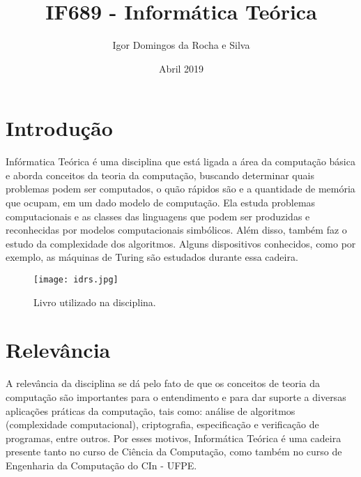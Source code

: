 \documentclass[10pt]{article}
\title{IF689 - Informática Teórica}
\author{Igor Domingos da Rocha e Silva }
\date{Abril 2019}
\begin{document}
\maketitle

\section{Introdução}
Infórmatica Teórica é uma disciplina que está ligada a área da computação básica e aborda conceitos da teoria da computação, buscando determinar quais problemas podem ser computados, o quão rápidos são e a quantidade de memória que ocupam,  em um dado modelo de computação. Ela estuda problemas computacionais e as classes das linguagens que podem ser produzidas e reconhecidas por modelos computacionais simbólicos. Além disso, também faz o estudo da complexidade dos algoritmos. Alguns dispositivos conhecidos, como por exemplo, as máquinas de Turing são estudados durante essa cadeira.
\cite{livro, Cin-Wiki, if689}
\begin{figure}[h!]
\centering
\texttt{[image: idrs.jpg]}
\caption{Livro utilizado na disciplina.}
\cite{img}
\label{fig:livro}
\end{figure}

\section{Relevância}
A relevância da disciplina se dá pelo fato de que os conceitos de teoria da computação são importantes para o entendimento e para dar suporte a diversas aplicações práticas da computação, tais como: análise de algoritmos (complexidade computacional), criptografia, especificação e verificação de programas, entre outros. Por esses motivos, Informática Teórica é uma cadeira presente tanto no curso de Ciência da Computação, como também no curso de Engenharia da Computação do CIn - UFPE.
\cite{relevancia}
\end{document}
